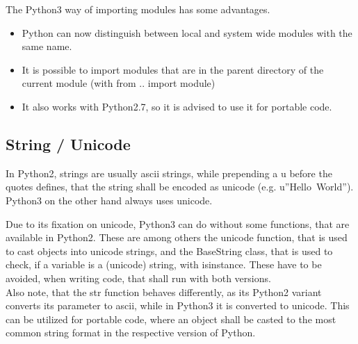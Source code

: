 			The Python3 way of importing modules has some advantages.
			\begin{itemize}
				\item Python can now distinguish between local and system wide modules with the same name.
				\item It is possible to import modules that are in the parent directory of the current module (with {\normalfont \ttfamily from .. import module})
				\item It also works with Python2.7, so it is advised to use it for portable code.
			\end{itemize}

		\subsection{String / Unicode}
			In Python2, strings are usually ascii strings, while prepending a {\normalfont \ttfamily u} before the quotes defines, that the string shall be encoded as unicode (e.g. {\normalfont \ttfamily u''Hello~World''}).
			Python3 on the other hand always uses unicode.

			Due to its fixation on unicode, Python3 can do without some functions, that are available in Python2.
			These are among others the {\normalfont \ttfamily unicode} function, that is used to cast objects into unicode strings, and the {\normalfont \ttfamily BaseString} class, that is used to check, if a variable is a (unicode) string, with {\normalfont \ttfamily isinstance}.
			These have to be avoided, when writing code, that shall run with both versions.\\
			Also note, that the {\normalfont \ttfamily str} function behaves differently, as its Python2 variant converts its parameter to ascii, while in Python3 it is converted to unicode.
			This can be utilized for portable code, where an object shall be casted to the most common string format in the respective version of Python.

